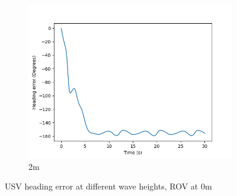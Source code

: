 \documentclass[class=article, crop=false]{standalone}
\begin{document}
\begin{figure}
\begin{subfigure}[b]{0.48\textwidth}
        \centering
        \includegraphics{scenario1/rov-0m/2.0m/usv_heading_error_uncontrolled}
        \caption{2m}
        \label{}
    \end{subfigure}

    \caption{USV heading error at different wave heights, ROV at 0m}
\end{figure}
\end{document}
